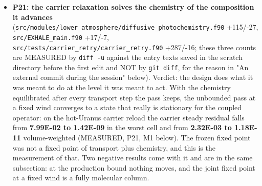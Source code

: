 \documentclass[english,a4paper]{my_memo}
\begin{document}
\begin{itemize}
  \texttt{hybrd1} and \texttt{fdjac1} took the \texttt{unit\_step\_floor} difference-step argument,
  \texttt{Source.f90} the well-balanced option (N37), \texttt{J\_inc.f90} the
  single-spectrum-type decision, and \texttt{speed\_estimate\_HLLC.f90} was deleted as
  dead code, so one upstream file is now removed rather than none.
  \texttt{Update\_EXHALE\_stage1.pdf} 464 -\textgreater{} 460 pages, \texttt{Update\_EXHALE\_stage2.pdf} 139 -\textgreater{} 158
  pages (MEASURED, \texttt{pdfinfo}).
\item
  \textbf{P21: the carrier relaxation solves the chemistry of the composition it
  advances} (\texttt{src/modules/lower\_atmosphere/diffusive\_photochemistry.f90}
  +115/-27, \texttt{src/EXHALE\_main.f90} +17/-7,
  \texttt{src/tests/carrier\_retry/carrier\_retry.f90} +287/-16; these three counts are
  MEASURED by \texttt{diff\ -u} against the entry texts saved in the scratch directory
  before the first edit and NOT by \texttt{git\ diff}, for the reason in "An external
  commit during the session" below). Verdict: the design does what it was meant
  to do at the level it was meant to act. With the chemistry equilibrated after
  every transport step the pass keeps, the unbounded pass at a fixed wind
  converges to a state that really is stationary for the coupled operator: on
  the hot-Uranus carrier reload the carrier steady residual falls from
  \textbf{7.99E-02 to 1.42E-09} in the worst cell and from \textbf{2.32E-03 to 1.18E-11}
  volume-weighted (MEASURED, P21, M1 below). The frozen fixed point was not a
  fixed point of transport plus chemistry, and this is the measurement of that.
  Two negative results come with it and are in the same subsection: at the
  production bound nothing moves, and the joint fixed point at a fixed wind is a
  fully molecular column.


\end{itemize}
\end{document}
